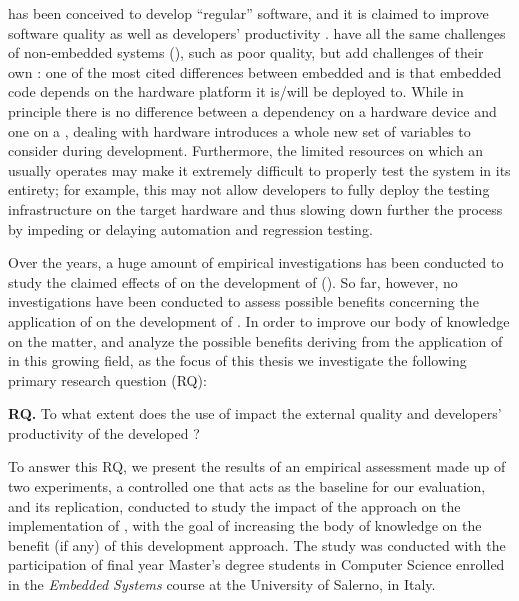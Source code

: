 \tdd has been conceived to develop “regular” software, and it is claimed to improve software quality as well as developers' productivity \cite{DBLP:reference/se/ErdogmusMJ10}. \ess have all the same challenges of non-embedded systems (\noess), such as poor quality, but add challenges of their own \cite{TDDEC}: one of the most cited differences between embedded and \noess is that embedded code depends on the hardware platform it is/will be deployed to. 
While in principle there is no difference between a dependency on a hardware device and one on a \noess \cite{TDDEC}, dealing with hardware introduces a whole new set of variables to consider during development. Furthermore, the limited resources on which an \es usually operates may make it extremely difficult to properly test the system in its entirety; for example, this may not allow developers to fully deploy the testing infrastructure on the target hardware and thus slowing down further the process by impeding or delaying automation and regression testing.

Over the years, a huge amount of empirical investigations has been conducted to study the claimed effects of \tdd on the development of \noess (\eg \cite{DBLP:journals/software/KaracT18}). So far, however, no investigations have been conducted to assess possible benefits concerning the application of \tdd on the development of \ess. In order to improve our body of knowledge on the matter, and analyze the possible benefits deriving from the application of \tdd in this growing field, as the focus of this thesis we investigate the following primary research question (RQ):

\begin{framed}
\noindent \textbf{RQ.} To what extent does the use of \tdd impact the external quality and developers' productivity of the developed \es?	
\end{framed}

To answer this RQ, we present the results of an empirical assessment made up of two experiments, a controlled one that acts as the baseline for our evaluation, and its replication, conducted to study the impact of the \tdd approach on the implementation of \ess, with the goal of increasing the body of knowledge on the benefit (if any) of this development approach.
The study was conducted with the participation of final year Master's degree students in Computer Science enrolled in the \textit{Embedded Systems} course at the University of Salerno, in Italy. 

